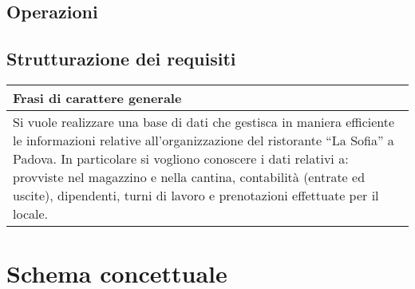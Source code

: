 \subsection{Operazioni}
\subsection{Strutturazione dei requisiti} 

\begin{longtable}{|p{15cm}|}
    \hline
    \textbf{Frasi di carattere generale} \\ \hline
    Si vuole realizzare una base di dati che gestisca in maniera efficiente le informazioni relative all’organizzazione del ristorante “La Sofia” a Padova. In particolare si vogliono conoscere i dati relativi a: provviste nel magazzino e nella cantina, contabilità (entrate ed uscite), dipendenti, turni di lavoro e prenotazioni effettuate per il locale. \\ \hline
\end{longtable}

\section{Schema concettuale} %

